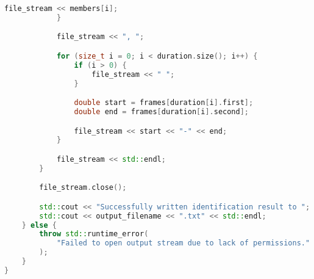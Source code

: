 \begin{lstlisting}[language=C++, caption=Implementasi 
modul \texttt{io.cpp},label={lamp:module-io}]
                file_stream << members[i];
            }

            file_stream << ", ";

            for (size_t i = 0; i < duration.size(); i++) {
                if (i > 0) {
                    file_stream << " ";
                }

                double start = frames[duration[i].first];
                double end = frames[duration[i].second];

                file_stream << start << "-" << end;
            }

            file_stream << std::endl;
        }

        file_stream.close();

        std::cout << "Successfully written identification result to ";
        std::cout << output_filename << ".txt" << std::endl;
    } else {
        throw std::runtime_error(
            "Failed to open output stream due to lack of permissions."
        );
    }
}
\end{lstlisting}


